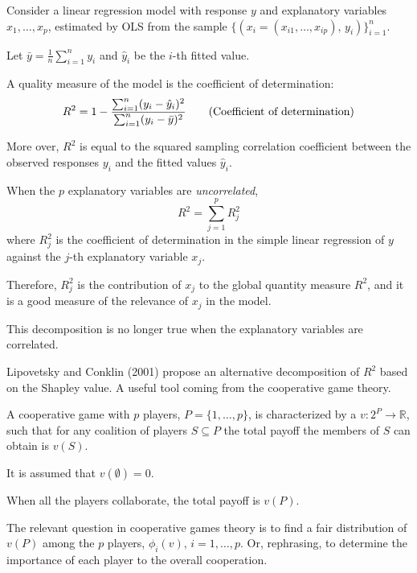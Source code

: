 Consider a linear regression model with response $y$ and explanatory
variables $x_1,\ldots,x_p$, estimated by OLS from the sample
$\{(x_i = (x_{i1},\ldots,x_{ip}),\,y_i)\}_{i=1}^n$.

Let $\bar y = \frac{1}{n} \sum_{i=1}^n y_i$ and $\hat y_i$ be the $i$-th fitted value.

A quality measure of the model is the coefficient of determination:
\begin{equation*}
	R^2 = 1 - \frac{\sum_{i=1}^n (y_i - \hat y_i)^2}{\sum_{i=1}^n (y_i - \bar y)^2}
	\tag{Coefficient of determination}\index{coefficient of determination}
\end{equation*}

More over, $R^2$ is equal to the squared sampling correlation coefficient
between the observed responses $y_i$ and the fitted values $\hat y_i$.

When the $p$ explanatory variables are \emph{uncorrelated},
\begin{equation*}
	R^2 = \sum_{j=1}^p R_j^2
\end{equation*}
where $R_j^2$ is the coefficient of determination in the simple linear regression
of $y$ against the $j$-th explanatory variable $x_j$.

Therefore, $R_j^2$ is the contribution of $x_j$ to the global quantity measure
$R^2$, and it is a good measure of the relevance of $x_j$ in the model.

\begin{note}
	This decomposition is no longer true when the explanatory variables are
	correlated.
\end{note}

Lipovetsky and Conklin (2001) propose an alternative decomposition of
$R^2$ based on the Shapley value. A useful tool coming from the
cooperative game theory.


A cooperative game with $p$ players, $P = \{1,\ldots,p\}$, is characterized
by a  $v: 2^P \to \mathbb R$, such that for any coalition
of players $S \subseteq P$ the total payoff the members of $S$ can obtain is
$v(S)$.

It is assumed that $v(\emptyset) = 0$.

When all the players collaborate, the total payoff is $v(P)$.

The relevant question in cooperative games theory is to find a fair
distribution of $v(P)$ among the $p$ players, $\phi_i(v),\,i = 1,\ldots,p$.
Or, rephrasing, to determine the importance of each player to the
overall cooperation.

